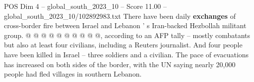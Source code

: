 \begin{textsample}{POS Dim 4 – global\_south\_2023\_10 – Score 11.00 – global\_south\_2023\_10/102892983.txt}
There have been daily \textbf{exchanges} of cross-border fire between Israel and Lebanon ' s Iran-backed Hezbollah militant group. @ @ @ @ @ @ @ @ @ @, according to an AFP tally -- mostly combatants but also at least four civilians, including a Reuters journalist.
And four people have been killed in Israel -- three soldiers and a civilian.
The pace of evacuations has increased on both sides of the border, with the UN saying nearly 20,000 people had fled villages in southern Lebanon.

\end{textsample}
